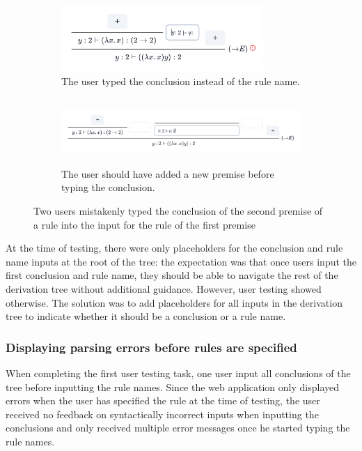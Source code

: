 \begin{figure}[!htbp]
    \centering
    \begin{subfigure}{\textwidth}
        \centering
        \includegraphics[height=2.5cm]{evaluation/premise-input-wrong.png}
        \caption{The user typed the conclusion instead of the rule name.}
    \end{subfigure}%
    \newline
    \begin{subfigure}{\textwidth}
        \centering
        \includegraphics[height=2.5cm]{evaluation/premise-input-correct.png}
        \caption{The user should have added a new premise before typing the conclusion.}
    \end{subfigure}
    \caption{Two users mistakenly typed the conclusion of the second premise of a rule into the input for the rule of the first premise}
    \label{fig:evaluation:wrong-premise-input}
\end{figure}

At the time of testing, there were only placeholders for the conclusion and rule name inputs at the root of the tree: the expectation was that once users input the first conclusion and rule name, they should be able to navigate the rest of the derivation tree without additional guidance. However, user testing showed otherwise. The solution was to add placeholders for all inputs in the derivation tree to indicate whether it should be a conclusion or a rule name.

\subsubsection{Displaying parsing errors before rules are specified}
When completing the first user testing task, one user input all conclusions of the tree before inputting the rule names. Since the web application only displayed errors when the user has specified the rule at the time of testing, the user received no feedback on syntactically incorrect inputs when inputting the conclusions and only received multiple error messages once he started typing the rule names.

